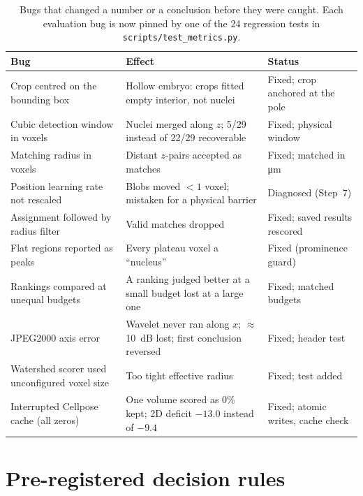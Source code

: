 \begin{table}[!htb]
  \centering\small
  \begin{tabularx}{\linewidth}{@{}>{\raggedright\arraybackslash}p{4.1cm}>{\raggedright\arraybackslash}X>{\raggedright\arraybackslash}p{3.6cm}@{}}
    \toprule
    Bug & Effect & Status \\
    \midrule
    Crop centred on the bounding box & Hollow embryo: crops fitted empty interior, not nuclei &
      Fixed; crop anchored at the pole \\
    Cubic detection window in voxels & Nuclei merged along $z$; 5/29 instead of 22/29 recoverable & Fixed; physical window \\
    Matching radius in voxels & Distant $z$-pairs accepted as matches & Fixed; matched in \si{\micro\meter} \\
    Position learning rate not rescaled & Blobs moved $<1$ voxel; mistaken for a physical barrier & Diagnosed (Step~7) \\
    Assignment followed by radius filter & Valid matches dropped & Fixed; saved results rescored \\
    Flat regions reported as peaks & Every plateau voxel a ``nucleus'' & Fixed (prominence guard) \\
    Rankings compared at unequal budgets & A ranking judged better at a small budget lost at a large one & Fixed; matched budgets \\
    JPEG2000 axis error & Wavelet never ran along $x$; $\approx$\SI{10}{dB} lost; first conclusion reversed & Fixed; header test \\
    Watershed scorer used unconfigured voxel size & Too tight effective radius & Fixed; test added \\
    Interrupted Cellpose cache (all zeros) & One volume scored as 0\% kept; 2D deficit $-13.0$ instead of $-9.4$ & Fixed; atomic writes, cache check \\
    \bottomrule
  \end{tabularx}
  \caption{Bugs that changed a number or a conclusion before they were caught. Each evaluation
  bug is now pinned by one of the 24 regression tests in \texttt{scripts/test\_metrics.py}.}
  \label{tab:bugs}
\end{table}

\section{Pre-registered decision rules}\label{app:rules}

